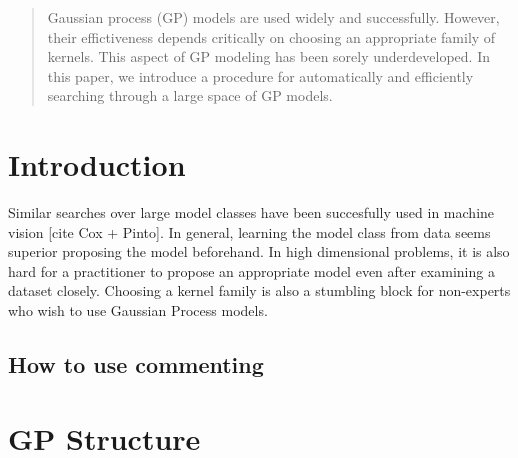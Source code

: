 \documentclass[twoside]{article}
\theoremstyle{definition}
\theoremstyle{remark}
\numberwithin{equation}{section}
\numberwithin{thm}{section}
\begin{document}
%

%



\begin{abstract}
Gaussian process (GP) models are used widely and successfully.  However, their effictiveness depends critically on choosing an appropriate family of kernels.  This aspect of GP modeling has been sorely underdeveloped.  In this paper, we introduce a procedure for automatically and efficiently searching through a large space of GP models.
\end{abstract}

\section{Introduction}

Similar searches over large model classes have been succesfully used in machine vision [cite Cox + Pinto].  In general, learning the model class from data seems superior proposing the model beforehand.  In high dimensional problems, it is also hard for a practitioner to propose an appropriate model even after examining a dataset closely.  Choosing a kernel family is also a stumbling block for non-experts who wish to use Gaussian Process models.

\subsection{How to use commenting}


\section{GP Structure}
\end{document}
